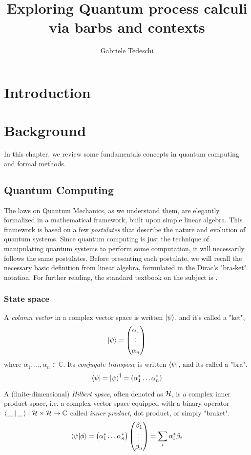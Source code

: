 \documentclass[10pt,a4paper, titlepage]{report}
\title{Exploring Quantum process calculi via barbs and contexts }
\author{Gabriele Tedeschi}
\theoremstyle{definition}
\newcommand{\kp}{\ket{\psi}}
\newcommand{\calH}{\mathcal{H}}
\begin{document}
\maketitle

\tableofcontents

\chapter{Introduction}

\chapter{Background}
In this chapter, we review some fundamentals concepts in quantum computing and formal methods.

\section{Quantum Computing}

The laws on Quantum Mechanics, as we understand them, are elegantly formalized in a mathematical framework, built upon simple linear algebra. This framework is based on a few \textit{postulates} that describe the nature and evolution of quantum systems. Since quantum computing is just the technique of manipulating quantum systems to perform some computation, it will necessarily follows the same postulates. Before presenting each postulate, we will recall the necessary basic definition from linear algebra, formulated in the Dirac's "bra-ket" notation. For further reading, the standard textbook on the subject is \cite{nielsen_chuang_2010}.


\subsection{State space}

A \textit{column vector} in a complex vector space is written $\kp$, and it's called a "ket",
\[ \kp = \begin{pmatrix}
		\alpha_1\\
		\vdots\\
		\alpha_n
\end{pmatrix}
\]
where $\alpha_1, \ldots,  \alpha_n \in \mathbb{C}$. Its \textit{conjugate transpose} is written $\bra{\psi}$, and its called a "bra".
	\[
		\bra{\psi} = \kp^\dagger = (\alpha_1^* \ldots \alpha_n^*)
	\]

A (finite-dimensional) \textit{Hilbert space}, often denoted as $\cal{H}$, is a complex inner product space, i.e. a complex vector space equipped with a binary operator $\braket{  \,\_\, |\, \_\, }: \calH \times \calH \rightarrow \mathbb{C}$ called \textit{inner product}, dot product, or simply "braket".
\[
	\braket{\psi | \phi} = 
	\begin{pmatrix}
	\alpha_1^* \ldots \alpha_n^*
	\end{pmatrix}\begin{pmatrix}
	\beta_1 \\
	\vdots \\
	\beta_n
	\end{pmatrix} = 
	\sum_i \alpha_i^*\beta_i
\]
\end{document}
